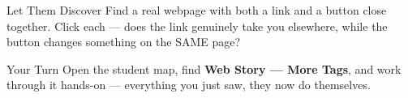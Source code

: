 \documentclass[aspectratio=169]{beamer}
\begin{document}
\begin{frame}{Let Them Discover}
    \Large
    Find a real webpage with both a link and a button close together. Click each — does the link genuinely take you elsewhere, while the button changes something on the SAME page?
\end{frame}

\begin{frame}{Your Turn}
    \Large
    Open the student map, find \textbf{Web Story — More Tags}, and work through it
    hands-on --- everything you just saw, they now do themselves.
\end{frame}
\end{document}

